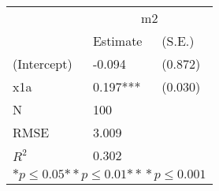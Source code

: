 \begin{tabular}{*{3}{l}}
\hline
                  & \multicolumn{2}{c}{m2}   \tabularnewline
                   &Estimate  &(S.E.)  \tabularnewline
 \hline
 \hline
   (Intercept)     &-0.094   &   (0.872) \tabularnewline
   x1a             &0.197***   &   (0.030) \tabularnewline
 \hline
 N                 &100       &        \tabularnewline
 RMSE             &3.009         & \tabularnewline
 $R^2$             &0.302         & \tabularnewline
 \hline
\hline
 
 \multicolumn{3}{c}{${*  p}\le 0.05$${*\!\!*  p}\le 0.01$${*\!\!*\!\!*  p}\le 0.001$}\tabularnewline
 \end{tabular}